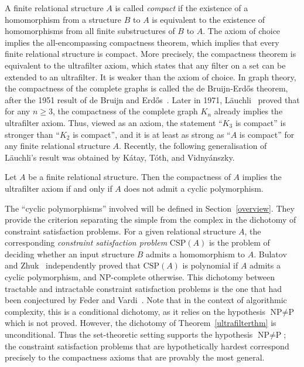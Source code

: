 \documentclass{lmcs}
\begin{document}
A finite relational structure $A$ is called {\em compact}
if the existence of a homomorphism from a structure $B$ to $A$ is equivalent to 
the existence of homomorphisms from all finite substructures of $B$ to $A$.
The axiom of choice implies the all-encompassing compactness theorem, which implies
that every  finite relational structure is compact.
More precisely, the compactness theorem is equivalent to the ultrafilter axiom, 
which states that any filter on a set can be extended to an ultrafilter. It is weaker
than the axiom of choice. In graph theory, the compactness 
of the complete graphs is called the de Bruijn-Erd\H{o}s theorem, after the 1951 result of de Bruijn and Erd\H{o}s~\cite{be}.
Later in 1971, L\"{a}uchli~\cite{lauchli} proved that for any $n \geq 3$, the compactness of the complete graph 
$K_n$ already implies the ultrafilter axiom. Thus, viewed as an axiom, the statement ``$K_3$ is compact'' is stronger than
``$K_2$ is compact'', and it is at least as strong as ``$A$ is compact'' for any finite relational structure $A$.
Recently, the following generalisation of L\"{a}uchli's result was obtained by 
K\'{a}tay, T\'{o}th, and Vidny\'{a}nszky.
\begin{thmC} \label{ultrafilterthm}
Let $A$ be a finite relational structure. Then the compactness of $A$ implies the ultrafilter axiom
if and only if $A$ does not admit a cyclic polymorphism.
\end{thmC}
\noindent
The ``cyclic polymorphisms'' involved will be defined in Section~\ref{overview}.
They provide the criterion separating the simple from the complex in the dichotomy 
of constraint satisfaction problems. For a given relational structure $A$, the corresponding 
{\em constraint satisfaction problem} $\mbox{CSP}(A)$
is the problem of deciding whether an input structure $B$ admits a homomorphism to $A$.
Bulatov~\cite{bulatov} and Zhuk~\cite{zhuk} independently proved that $\mbox{CSP}(A)$
is polynomial if $A$ admits a cyclic polymorphism, and NP-complete otherwise.
This dichotomy between tractable and intractable constraint satisfaction problems is
the one that had been conjectured by Feder and Vardi~\cite{federvardi}.
Note that in the context of algorithmic complexity, this is a conditional dichotomy,
as it relies on the hypothesis $\mbox{NP}\neq \mbox{P}$ which is not proved.
However, the dichotomy of Theorem~\ref{ultrafilterthm} is unconditional.
Thus the set-theoretic setting supports the hypothesis  $\mbox{NP}\neq \mbox{P}$;
the constraint satisfaction problems that are hypothetically hardest correspond
precisely to the compactness axioms that are provably the most general.
\end{document}
